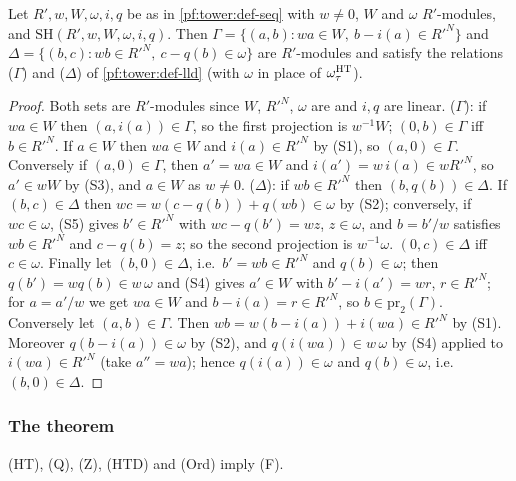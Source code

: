 \begin{lemma}\label{pf:tower:gamdel}
Let $R',w,W,\omega,i,q$ be as in \cref{pf:tower:def-seq} with $w\ne0$, $W$ and $\omega$ $R'$-modules, and
$\mathrm{SH}(R',w,W,\omega,i,q)$. Then $\Gamma=\{(a,b):wa\in W,\ b-i(a)\in R'^N\}$ and
$\Delta=\{(b,c):wb\in R'^N,\ c-q(b)\in\omega\}$ are $R'$-modules and satisfy the relations \textup{($\Gamma$)} and
\textup{($\Delta$)} of \cref{pf:tower:def-lld} (with $\omega$ in place of $\omega^{\mathrm{HT}}_\tau$).
\end{lemma}

\begin{proof}
Both sets are $R'$-modules since $W$, $R'^N$, $\omega$ are and $i,q$ are linear. ($\Gamma$): if $wa\in W$ then
$(a,i(a))\in\Gamma$, so the first projection is $w^{-1}W$; $(0,b)\in\Gamma$ iff $b\in R'^N$. If $a\in W$ then
$wa\in W$ and $i(a)\in R'^N$ by (S1), so $(a,0)\in\Gamma$. Conversely if $(a,0)\in\Gamma$, then $a'=wa\in W$ and
$i(a')=w\,i(a)\in wR'^N$, so $a'\in wW$ by (S3), and $a\in W$ as $w\ne0$.
($\Delta$): if $wb\in R'^N$ then $(b,q(b))\in\Delta$. If $(b,c)\in\Delta$ then
$wc=w(c-q(b))+q(wb)\in\omega$ by (S2); conversely, if $wc\in\omega$, (S5) gives $b'\in R'^N$ with
$wc-q(b')=wz$, $z\in\omega$, and $b=b'/w$ satisfies $wb\in R'^N$ and $c-q(b)=z$; so the second projection is
$w^{-1}\omega$. $(0,c)\in\Delta$ iff $c\in\omega$. Finally let $(b,0)\in\Delta$, i.e.\ $b'=wb\in R'^N$ and
$q(b)\in\omega$; then $q(b')=wq(b)\in w\,\omega$ and (S4) gives $a'\in W$ with $b'-i(a')=wr$, $r\in R'^N$; for
$a=a'/w$ we get $wa\in W$ and $b-i(a)=r\in R'^N$, so $b\in\mathrm{pr}_2(\Gamma)$. Conversely let $(a,b)\in\Gamma$. Then
$wb=w(b-i(a))+i(wa)\in R'^N$ by (S1). Moreover $q(b-i(a))\in\omega$ by (S2), and $q(i(wa))\in w\,\omega$ by (S4)
applied to $i(wa)\in R'^N$ (take $a''=wa$); hence $q(i(a))\in\omega$ and $q(b)\in\omega$, i.e.\ $(b,0)\in\Delta$.
\end{proof}

\subsubsection*{The theorem}

\begin{theorem}\label{pf:tower:fam}
\textup{(HT)}, \textup{(Q)}, \textup{(Z)}, \textup{(HTD)} and \textup{(Ord)} imply \textup{(F)}.
\end{theorem}

